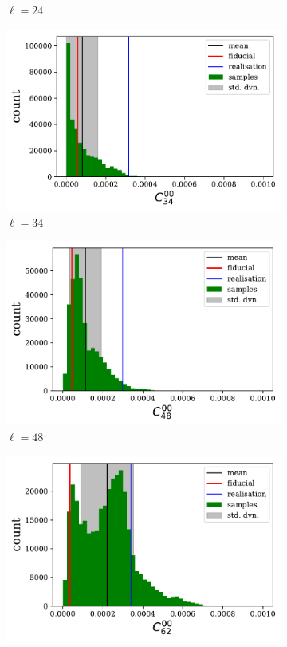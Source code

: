 \begin{figure}
\begin{subfigure}{.5\textwidth}
  \caption{$\ell = 24$}
\end{subfigure}
\begin{subfigure}{.5\textwidth}
  \centering
  \includegraphics[scale=0.50]{BPL-FIGS/Euclid-foot-LN-PoiNoi-N32-HISTOGRAM-ell-34.pdf}
  \caption{$\ell = 34$}
\end{subfigure}
\begin{subfigure}{.5\textwidth}
  \centering
  \includegraphics[scale=0.50]{BPL-FIGS/Euclid-foot-LN-PoiNoi-N32-HISTOGRAM-ell-48.pdf}
  \caption{$\ell = 48$}
\end{subfigure}
\begin{subfigure}{.5\textwidth}
  \centering
  \includegraphics[scale=0.50]{BPL-FIGS/Euclid-foot-LN-PoiNoi-N32-HISTOGRAM-ell-62.pdf}

\end{subfigure}
\end{figure}
